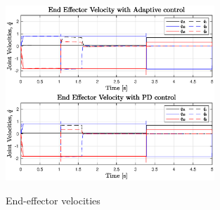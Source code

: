 	\begin{figure}[H]
		\centering
		\includegraphics[width=0.7\textwidth]{figures/eeVel.eps}
		\label{fig:eeVel}
		\caption{End-effector velocities}
	\end{figure}

	\autocite{lewis2003robot}
